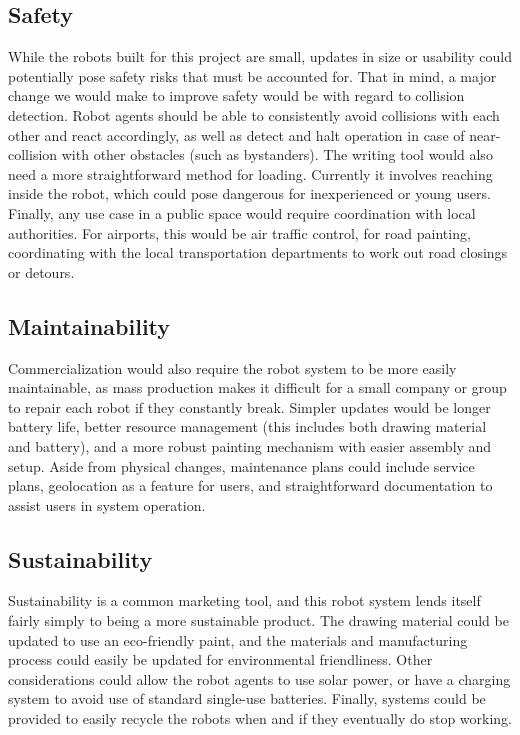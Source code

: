 \subsection{Safety}
While the robots built for this project are small, updates in size or usability could potentially pose safety risks that must be accounted for. That in mind, a major change we would make to improve safety would be with regard to collision detection. Robot agents should be able to consistently avoid collisions with each other and react accordingly, as well as detect and halt operation in case of near-collision with other obstacles (such as bystanders). The writing tool would also need a more straightforward method for loading. Currently it involves reaching inside the robot, which could pose dangerous for inexperienced or young users. Finally, any use case in a public space would require coordination with local authorities. For airports, this would be air traffic control, for road painting, coordinating with the local transportation departments to work out road closings or detours.

\subsection{Maintainability}
Commercialization would also require the robot system to be more easily maintainable, as mass production makes it difficult for a small company or group to repair each robot if they constantly break. Simpler updates would be longer battery life, better resource management (this includes both drawing material and battery), and a more robust painting mechanism with easier assembly and setup. Aside from physical changes, maintenance plans could include service plans, geolocation as a feature for users, and straightforward documentation to assist users in system operation.

\subsection{Sustainability}
Sustainability is a common marketing tool, and this robot system lends itself fairly simply to being a more sustainable product. The drawing material could be updated to use an eco-friendly paint, and the materials and manufacturing process could easily be updated for environmental friendliness. Other considerations could allow the robot agents to use solar power, or have a charging system to avoid use of standard single-use batteries. Finally, systems could be provided to easily recycle the robots when and if they eventually do stop working.

